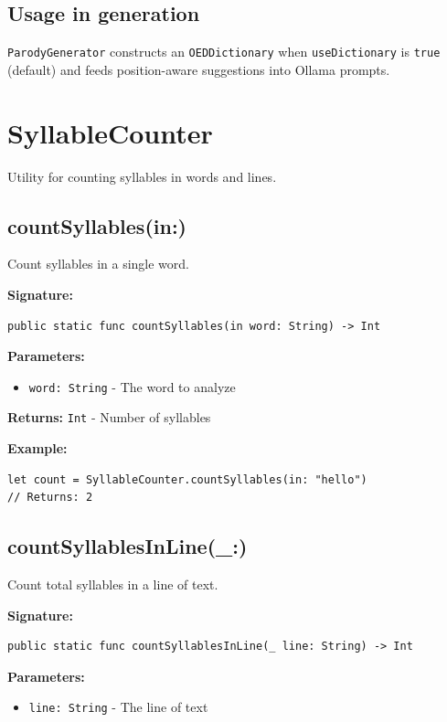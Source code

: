 \documentclass[11pt,a4paper]{article}
\begin{document}
\subsection{Usage in generation}

\texttt{ParodyGenerator} constructs an \texttt{OEDDictionary} when \texttt{useDictionary} is \texttt{true} (default) and feeds position-aware suggestions into Ollama prompts.

\section{SyllableCounter}

Utility for counting syllables in words and lines.

\subsection{countSyllables(in:)}

Count syllables in a single word.

\textbf{Signature:}
\begin{lstlisting}
public static func countSyllables(in word: String) -> Int
\end{lstlisting}

\textbf{Parameters:}
\begin{itemize}
    \item \texttt{word: String} - The word to analyze
\end{itemize}

\textbf{Returns:} \texttt{Int} - Number of syllables

\textbf{Example:}
\begin{lstlisting}
let count = SyllableCounter.countSyllables(in: "hello")
// Returns: 2
\end{lstlisting}

\subsection{countSyllablesInLine(\_:)}

Count total syllables in a line of text.

\textbf{Signature:}
\begin{lstlisting}
public static func countSyllablesInLine(_ line: String) -> Int
\end{lstlisting}

\textbf{Parameters:}
\begin{itemize}
    \item \texttt{line: String} - The line of text
\end{itemize}
\end{document}
